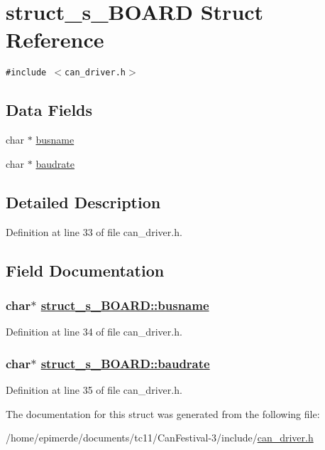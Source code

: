 \hypertarget{structstruct__s__BOARD}{
\section{struct\_\-s\_\-BOARD Struct Reference}
\label{structstruct__s__BOARD}
}
{\tt \#include $<$can\_\-driver.h$>$}

\subsection*{Data Fields}
\begin{CompactItemize}
\item 
char $\ast$ \hyperlink{structstruct__s__BOARD_fb28847fd702021b624afe1f7d4b25b2}{busname}
\item 
char $\ast$ \hyperlink{structstruct__s__BOARD_5316679ded23cf846c63c06ab51a4646}{baudrate}
\end{CompactItemize}


\subsection{Detailed Description}




Definition at line 33 of file can\_\-driver.h.

\subsection{Field Documentation}
\hypertarget{structstruct__s__BOARD_fb28847fd702021b624afe1f7d4b25b2}{
\subsubsection[busname]{\setlength{\rightskip}{0pt plus 5cm}char$\ast$ \hyperlink{structstruct__s__BOARD_fb28847fd702021b624afe1f7d4b25b2}{struct\_\-s\_\-BOARD::busname}}}
\label{structstruct__s__BOARD_fb28847fd702021b624afe1f7d4b25b2}




Definition at line 34 of file can\_\-driver.h.\hypertarget{structstruct__s__BOARD_5316679ded23cf846c63c06ab51a4646}{
\subsubsection[baudrate]{\setlength{\rightskip}{0pt plus 5cm}char$\ast$ \hyperlink{structstruct__s__BOARD_5316679ded23cf846c63c06ab51a4646}{struct\_\-s\_\-BOARD::baudrate}}}
\label{structstruct__s__BOARD_5316679ded23cf846c63c06ab51a4646}




Definition at line 35 of file can\_\-driver.h.

The documentation for this struct was generated from the following file:\begin{CompactItemize}
\item 
/home/epimerde/documents/tc11/Can\-Festival-3/include/\hyperlink{can__driver_8h}{can\_\-driver.h}\end{CompactItemize}
